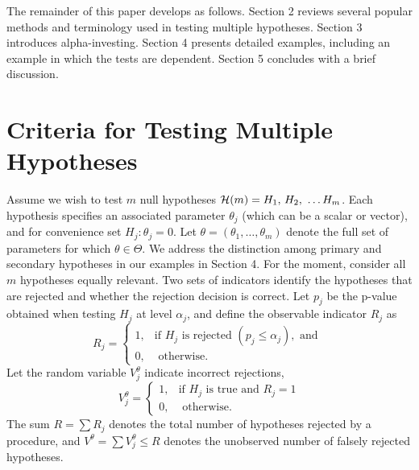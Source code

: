\documentclass[12pt]{article}
\begin{document}
 The remainder of this paper develops as follows.  Section 2 reviews several
 popular methods and terminology used in testing multiple hypotheses.  Section 3
 introduces alpha-investing.  Section 4 presents detailed examples, including an
 example in which the tests are dependent.  Section 5 concludes with a brief
 discussion.


\section{Criteria for Testing Multiple Hypotheses}   %


 Assume we wish to test $m$ null hypotheses ${\cal H}(m) = H_1,\, H_2,\ \ldots
 H_m$.  Each hypothesis specifies an associated parameter $\theta_j$ (which can
 be a scalar or vector), and for convenience set $H_j: \theta_j = 0$.  Let
 $\theta = (\theta_1, \ldots, \theta_m)$ denote the full set of parameters for
 which $\theta \in \Theta$.  We address the distinction among primary and
 secondary hypotheses in our examples in Section 4.  For the moment, consider
 all $m$ hypotheses equally relevant.  Two sets of indicators identify the
 hypotheses that are rejected and whether the rejection decision is correct.
  Let $p_j$ be the p-value obtained when testing $H_j$ at level $\alpha_j$, and
 define the observable indicator $R_j$ as
\begin{equation}
   R_{j} = \left\{\begin{array}{cl}
       1, & \mbox{if } H_{j} \mbox{ is rejected }(p_{j} \le \alpha_{j}),\mbox{ and } \\
       0, & \mbox{ otherwise.}
       \end{array} \right.
\label{eq:Rj}
\end{equation}
 Let the random variable $V^{\theta}_j$ indicate incorrect rejections,
\begin{equation}
   V^{\theta}_{j} = \left\{\begin{array}{cl}
       1, & \mbox{if } H_j \mbox{ is true and } R_j = 1  \\
       0, & \mbox{ otherwise.}
       \end{array} \right.
\label{eq:Vj}
\end{equation}  
 The sum $R = \sum R_j$ denotes the total number of hypotheses rejected by a
 procedure, and $V^\theta = \sum V^\theta_j \le R$ denotes the unobserved number
 of falsely rejected hypotheses.
\end{document}
